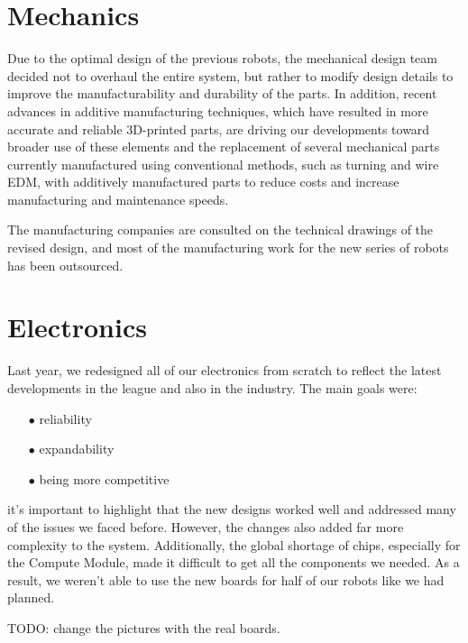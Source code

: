 \documentclass[runningheads]{llncs}
\begin{document}
\section {Mechanics}
Due to the optimal design of the previous robots, the mechanical design team decided not to overhaul the entire system, but rather to modify design details to improve the manufacturability and durability of the parts. In addition, recent advances in additive manufacturing techniques, which have resulted in more accurate and reliable 3D-printed parts, are driving our developments toward broader use of these elements and the replacement of several mechanical parts currently manufactured using conventional methods, such as turning and wire EDM, with additively manufactured parts to reduce costs and increase manufacturing and maintenance speeds.

The manufacturing companies are consulted on the technical drawings of the revised design, and most of the manufacturing work for the new series of robots has been outsourced.

\section{Electronics}

\indent Last year, we redesigned all of our electronics from scratch to reflect the latest developments in the league and also in the industry. The main goals were:

\begin{enumerate}
    \item[$\bullet$] reliability
    \item[$\bullet$] expandability
    \item[$\bullet$] being more competitive
\end{enumerate}

it's important to highlight that the new designs worked well and addressed many of the issues we faced before. However, the changes also added far more complexity to the system. Additionally, the global shortage of chips, especially for the Compute Module, made it difficult to get all the components we needed. As a result, we weren't able to use the new boards for half of our robots like we had planned.

TODO: change the pictures with the real boards.
\end{document}
